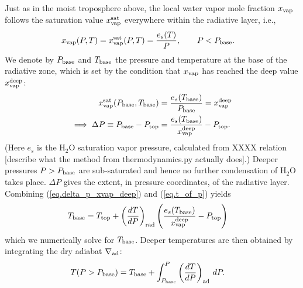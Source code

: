 \documentclass[11pt]{ucscthesisbs}
\begin{document}
Just as in the moist troposphere above, the local water vapor mole fraction $x_{\rm vap}$ follows the saturation value $x_{\rm vap}^{\rm sat}$ everywhere within the radiative layer, i.e.,
\begin{align}
x_{\rm vap}(P, T) &= x_{\rm vap}^{\rm sat}(P, T) = \frac{e_s(T)}{P}, \qquad P<P_{\rm base}.
\end{align}
We denote by $P_{\rm base}$ and $T_{\rm base}$ the pressure and temperature at the base of the radiative zone, which is set by the condition that $x_{\rm vap}$ has reached the deep value $x_{\rm vap}^{\rm deep}$:
\begin{align}
x_{\rm vap}^{\rm sat}(P_{\rm base}, T_{\rm base}) &= \frac{e_s(T_{\rm base})}{P_{\rm base}}=x_{\rm vap}^{\rm deep} \\
\implies \Delta P \equiv P_{\rm base}-P_{\rm top} &= \frac{e_s(T_{\rm base})}{x_{\rm vap}^{\rm deep}} - P_{\rm top}.\label{eq.delta_p_xvap_deep}
\end{align}
(Here $e_s$ is the H$_2$O saturation vapor pressure, calculated from XXXX relation [describe what the method from thermodynamics.py actually does].)
Deeper pressures $P>P_{\rm base}$ are sub-saturated and hence no further condensation of H$_2$O takes place.
$\Delta P$ gives the extent, in pressure coordinates, of the radiative layer. Combining (\ref{eq.delta_p_xvap_deep}) and (\ref{eq.t_of_p}) yields  
\begin{align}
T_{\rm base} &= T_{\rm top} + \left(\frac{dT}{dP}\right)_{\rm rad}\left(\frac{e_s(T_{\rm base})}{x_{\rm vap}^{\rm deep}} - P_{\rm top}\right)
\end{align}
which we numerically solve for $T_{\rm base}$. Deeper temperatures are then obtained by integrating the dry adiabat $\nabla_{\rm ad}$:
\begin{align}
T(P>P_{\rm base}) &= T_{\rm base} + \int_{P_{\rm base}}^P\left(\frac{dT}{dP}\right)_{\rm ad}\,d P. \label{eq.t_of_p_deep_dry}
\end{align}
\end{document}
